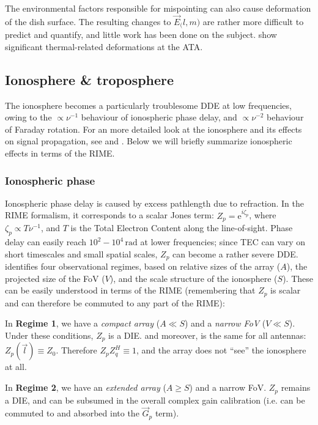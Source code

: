 \documentclass[]{aa}
\newcommand{\herm}{H}
\newcommand{\jones}[2]{\vec {#1}_{#2}}
\begin{document}
The environmental factors responsible for mispointing can also cause deformation of the dish surface. The resulting changes to $\jones{E}(l,m)$ are rather more difficult to predict and quantify, and little work has been done on the subject. \citet{Harp:ATA-beams} show significant thermal-related deformations at the ATA.

\subsection{Ionosphere \& troposphere}

The ionosphere becomes a particularly troublesome DDE at low frequencies, owing to the $\propto\nu^{-1}$ behaviour of ionospheric phase delay, and $\propto\nu^{-2}$ behaviour of Faraday rotation. For an more detailed look at the ionosphere and its effects on signal propagation, see \citet[Sect.~13.3]{tms} and \citet{Intema:SPAM}. Below we will briefly summarize ionospheric effects in terms of the RIME.

\subsubsection{Ionospheric phase}

Ionospheric phase delay is caused by excess pathlength due to refraction. In the RIME formalism, it corresponds to a scalar Jones term: $Z_p=\mathrm{e}^{i\zeta_p}$, where $\zeta_p\propto T \nu^{-1}$, and $T$ is the Total Electron Content along the line-of-sight. Phase delay can easily reach $10^2-10^4\,\mathrm{rad}$ at lower frequencies; since TEC can vary on short timescales and small spatial scales, $Z_p$ can become a rather severe DDE. \citet{Lonsdale:4regimes} identifies four observational regimes, based on relative sizes of the array ($A$), the projected size of the FoV ($V$), and the scale structure of the ionosphere ($S$). These can be easily understood in terms of the RIME (remembering that $Z_p$ is scalar and can therefore be commuted to any part of the RIME):

In {\bf Regime 1}, we have a \emph{compact array} ($A \ll S$) and a \emph{narrow FoV} ($V\ll S$). Under these conditions, $Z_p$ is a DIE. and moreover, is the same for all antennas: $Z_p(\vec l) \equiv Z_0$. Therefore $Z_p Z_q^\herm \equiv 1$, and the array does not ``see'' the ionosphere at all.

In {\bf Regime 2}, we have an \emph{extended array} ($A \ge S$) and a narrow FoV. $Z_p$ remains a DIE, and can be subsumed in the overall complex gain calibration (i.e. can be commuted to and absorbed into the $\jones{G}{p}$ term).
\end{document}
